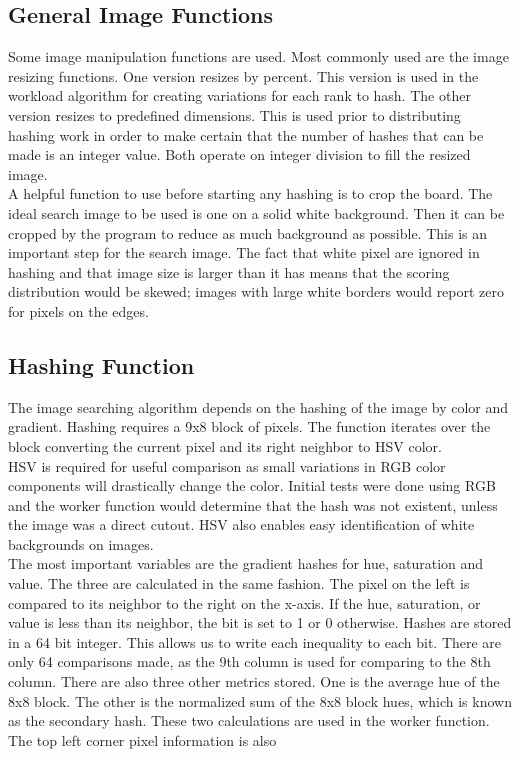\documentclass[10pt, journal]{vgtc}                %
\begin{document}
\subsection{General Image Functions}

Some image manipulation functions are used. Most commonly used are the image resizing functions. One version resizes by percent. This version is used in the workload algorithm for creating variations for each rank to hash. The other version resizes to predefined dimensions. This is used prior to distributing hashing work in order to make certain that the number of hashes that can be made is an integer value. Both operate on integer division to fill the resized image. \\
A helpful function to use before starting any hashing is to crop the board. The ideal search image to be used is one on a solid white background. Then it can be cropped by the program to reduce as much background as possible. This is an important step for the search image. The fact that white pixel are ignored in hashing and that image size is larger than it has means that the scoring distribution would be skewed; images with large white borders would report zero for pixels on the edges.

\subsection{Hashing Function}
	The image searching algorithm depends on the hashing of the image by color and gradient. Hashing requires a 9x8 block of pixels. The function iterates over the block converting the current pixel and its right neighbor to HSV color. \\
HSV is required for useful comparison as small variations in RGB color components will drastically change the color. Initial tests were done using RGB and the worker function would determine that the hash was not existent, unless the image was a direct cutout. HSV also enables easy identification of white backgrounds on images.\\
The most important variables are the gradient hashes for hue, saturation and value. The three are calculated in the same fashion. The pixel on the left is compared to its neighbor to the right on the x-axis. If the hue, saturation, or value is less than its neighbor, the bit is set to 1 or 0 otherwise. Hashes are stored in a 64 bit integer. This allows us to write each inequality to each bit. There are only 64 comparisons made, as the 9th column is used for comparing to the 8th column.
There are also three other metrics stored. One is the average hue of the 8x8 block. The other is the normalized sum of the 8x8 block hues, which is known as the secondary hash. These two calculations are used in the worker function. The top left corner pixel information is also 
\end{document}
